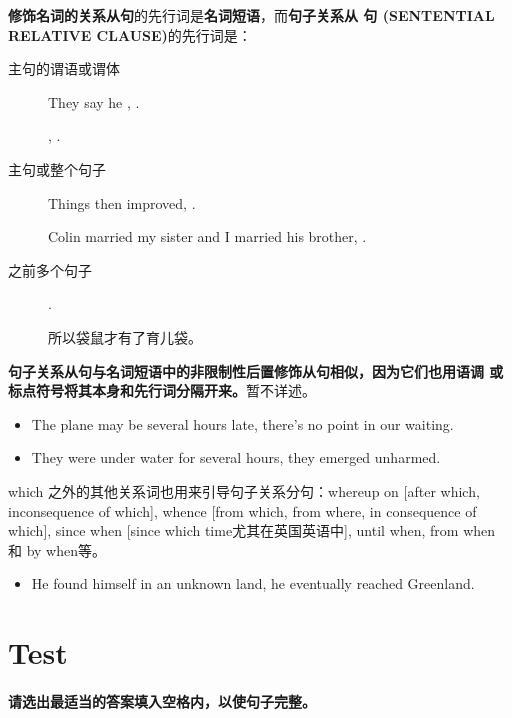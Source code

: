 \textbf{修饰名词的关系从句}的先行词是\textbf{名词短语}，而\textbf{句子关系从
  句 (SENTENTIAL RELATIVE CLAUSE)}的先行词是：
\begin{description}
\item[主句的谓语或谓体] They say he , .

  , .

\item[主句或整个句子] Things then improved, .

  Colin married my sister and I married his brother, .

\item[之前多个句子] .

  所以袋鼠才有了育儿袋。
\end{description}

\textbf{句子关系从句与名词短语中的非限制性后置修饰从句相似，因为它们也用语调
  或标点符号将其本身和先行词分隔开来。}暂不详述。
\begin{itemize}
\item The plane may be several hours late,  there's no point in our waiting.

\item They were under water for several hours,  they
  emerged unharmed.
\end{itemize}

which 之外的其他关系词也用来引导句子关系分句：whereup on [after which,
inconsequence of which], whence [from which, from where, in consequence of
which], since when [since which time尤其在英国英语中], until when, from when
和 by when等。

\begin{itemize}
\item He found himself in an unknown land,  he eventually reached Greenland.
\end{itemize}

\section{Test}

\paragraph{请选出最适当的答案填入空格内，以使句子完整。}

